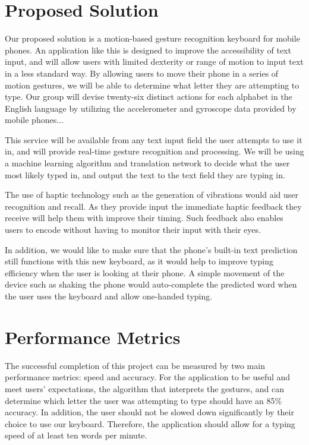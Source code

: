 \documentclass[onecolumn,draftclsnofoot,10pt, journal, letterpaper]{IEEEtran}
\begin{document}
\section{Proposed Solution}
Our proposed solution is a motion-based gesture recognition keyboard for mobile phones. An application like this is designed to improve the accessibility of text input, and will allow users with limited dexterity or range of motion to input text in a less standard way. By allowing users to move their phone in a series of motion gestures, we will be able to determine what letter they are attempting to type. Our group will devise twenty-six distinct actions for each alphabet in the English language by utilizing the accelerometer and gyroscope data provided by mobile phones...
\par This service will be available from any text input field the user attempts to use it in, and will provide real-time gesture recognition and processing. We will be using a machine learning algorithm and translation network to decide what the user most likely typed in, and output the text to the text field they are typing in.
\par The use of haptic technology such as the generation of vibrations would aid user recognition and recall. As they provide input the immediate haptic feedback they receive will help them with improve their timing. Such feedback also enables users to encode without having to monitor their input with their eyes. 
\par In addition, we would like to make sure that the phone’s built-in text prediction still functions with this new keyboard, as it would help to improve typing efficiency when the user is looking at their phone. A simple movement of the device such as shaking the phone would auto-complete the predicted word when the user uses the keyboard and allow one-handed typing.

\section{Performance Metrics}
The successful completion of this project can be measured by two main performance metrics: speed and accuracy. For the application to be useful and meet users' expectations, the algorithm that interprets the gestures, and can determine which letter the user was attempting to type should have an 85\% accuracy. In addition, the user should not be slowed down significantly by their choice to use our keyboard. Therefore, the application should allow for a typing speed of at least ten words per minute. 
\end{document}
